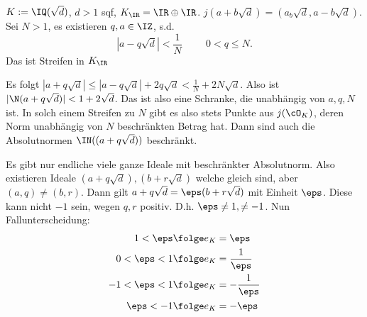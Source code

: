 \begin{Beweis}
$K:=\IQ(\sqrt d)$, $d>1$ sqf, $K_\IR=\IR\oplus\IR$. $j(a+b\sqrt{d})=(a_b\sqrt{d},a-b\sqrt{d})$. Sei $N>1$, es existieren $q,a\in\IZ$, s.d.
\[|a-q\sqrt{d}|<\frac{1}{N}\hspace{1cm} 0<q\leq N.\]
Das ist Streifen in $K_\IR$

\begin{center}
\end{center}

Es folgt $|a+q\sqrt d|\leq |a-q\sqrt{d}|+2q\sqrt d< \frac{1}{N} + 2N\sqrt{d}$. Also ist $|\N(a+q\sqrt d)|<1+2\sqrt{d}$. Das ist also eine Schranke, die unabhängig von $a,q,N$ ist. In solch einem Streifen zu $N$ gibt es also stets Punkte aus $j(\cO_K)$, deren Norm unabhängig von $N$ beschränkten Betrag hat. Dann sind auch die Absolutnormen $\IN((a+q\sqrt{d}))$ beschränkt.

Es gibt nur endliche viele ganze Ideale mit beschränkter Absolutnorm. Also existieren Ideale $(a+q\sqrt d), (b+r\sqrt d)$ welche gleich sind, aber $(a,q)\neq (b,r)$.
Dann gilt $a+q\sqrt{d}=\eps(b+r\sqrt{d})$ mit Einheit $\eps$. Diese kann nicht $-1$ sein, wegen $q,r$ positiv. D.h. $\eps\neq 1, \neq -1$. Nun Fallunterscheidung:
\begin{align*}
 1<\eps &\folge  e_K=\eps\\
 0<\eps<1 &\folge  e_K=\frac{1}{\eps}\\
 -1<\eps<1 &\folge  e_K=-\frac{1}{\eps}\\
 \eps<-1 &\folge  e_K=-\eps
\end{align*}
\end{Beweis}

